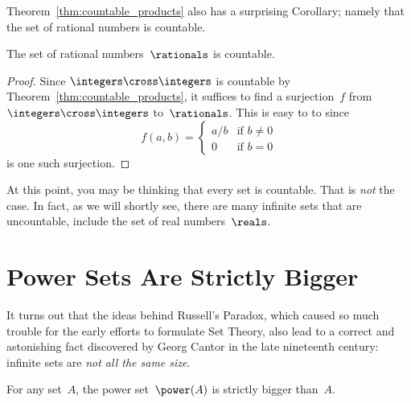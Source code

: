 Theorem~\ref{thm:countable_products} also has a surprising Corollary;
namely that the set of rational numbers is countable.

\begin{corollary}\label{cor:countable_rationals}
The set of rational numbers~$\rationals$ is countable.
\end{corollary}

\begin{proof}
Since $\integers \cross \integers$ is countable by
Theorem~\ref{thm:countable_products}, it suffices to find a
surjection~$f$ from $\integers \cross \integers$ to~$\rationals$.
This is easy to to since
\begin{equation*}
f(a, b) = \begin{cases}
            a/b & \text{if $b \ne 0$} \\
              0 & \text{if $b = 0$}
          \end{cases}
\end{equation*}
is one such surjection.
\end{proof}

At this point, you may be thinking that every set is countable.  That
is \emph{not} the case.  In fact, as we will shortly see, there are
many infinite sets that are uncountable, include the set of real
numbers~$\reals$.

\section{Power Sets Are Strictly Bigger}

It turns out that the ideas behind Russell's Paradox, which caused so
much trouble for the early efforts to formulate Set Theory, also lead
to a correct and astonishing fact discovered by Georg Cantor in the
late nineteenth century: infinite sets are \emph{not all the same
  size}.

\begin{theorem}\label{thm:power_sets}
For any set~$A$, the power set~$\power(A)$ is strictly bigger
than~$A$.
\end{theorem}

